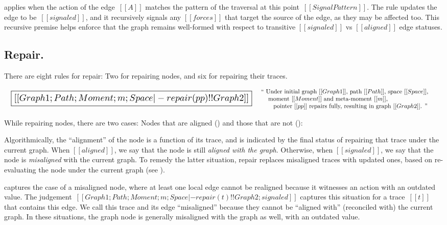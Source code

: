 \documentclass[11pt]{article}
\begin{document}
 applies when the action of the edge~$[[A]]$
matches the pattern of the traversal at this
point~$[[SignalPattern]]$.
%
The rule updates the edge to be~$[[signaled]]$, and it recursively
signals any $[[forces]]$ that target the source of the edge, as they
may be affected too.
%
This recursive premise helps enforce that the graph remains
well-formed with respect to transitive $[[signaled]]$ vs $[[aligned]]$ edge statuses.


\subsection{Repair.}

There are eight rules for repair: Two for repairing nodes, and six for repairing their traces.

\[
\begin{array}{lc}
  {\scalebox{1.5}{
  \boxed{[[Graph1; Path; Moment; m; Space |- repair(pp) !! Graph2]]}}}
&
\begin{array}{p{4in}}
  ``
  Under initial graph~$[[Graph1]]$,
  path~$[[Path]]$,
  space~$[[Space]]$,\\
  \hspace{3mm}~moment~$[[Moment]]$ and meta-moment~$[[m]]$,\\
  \hspace{6mm}~pointer~$[[pp]]$ repairs fully,
  resulting in graph~$[[Graph2]]$.
  ''
\end{array}
\end{array}
\]

While repairing nodes, there are two cases: Nodes that are aligned
() and those that are not ():

\begin{mathpar}
\end{mathpar}

Algorithmically, the ``alignment'' of the node is a function of its trace, and is indicated by the final status of repairing that trace under the current graph.
%
When $[[aligned]]$, we say that the node is still \emph{aligned with the graph}.
Otherwise, when $[[signaled]]$, we say that the node is \emph{misaligned} with the current graph.
%
To remedy the latter situation, repair replaces misaligned traces with updated ones,
based on re-evaluating the node under the current graph (see ).
%

 captures the case of a misaligned node, where at least one
local edge cannot be realigned because it witnesses an action with an
outdated value.
%
The judgement~$[[Graph1; Path; Moment; m; Space |- repair(t) !!
    Graph2; signaled]]$ captures this situation for a trace~$[[t]]$ that contains this edge.
%
We call this trace and its edge ``misaligned'' because they cannot be ``aligned with''
(reconciled with) the current graph.
%
In these situations, the graph node is generally misaligned with the graph as well, with an outdated value.
\end{document}
